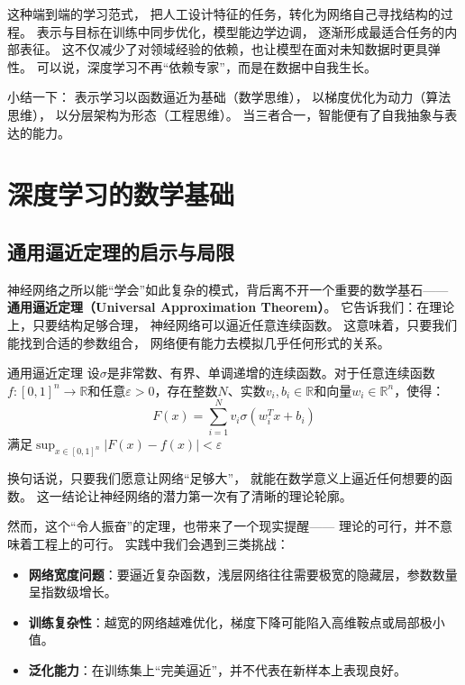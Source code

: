 这种端到端的学习范式，  
把人工设计特征的任务，转化为网络自己寻找结构的过程。  
表示与目标在训练中同步优化，模型能边学边调，  
逐渐形成最适合任务的内部表征。  
这不仅减少了对领域经验的依赖，也让模型在面对未知数据时更具弹性。  
可以说，深度学习不再“依赖专家”，而是在数据中自我生长。  

小结一下：  
表示学习以函数逼近为基础（数学思维），  
以梯度优化为动力（算法思维），  
以分层架构为形态（工程思维）。  
当三者合一，智能便有了自我抽象与表达的能力。

\section{深度学习的数学基础}

\subsection{通用逼近定理的启示与局限}

神经网络之所以能“学会”如此复杂的模式，背后离不开一个重要的数学基石——  
\textbf{通用逼近定理（Universal Approximation Theorem）}。  
它告诉我们：在理论上，只要结构足够合理，  
神经网络可以逼近任意连续函数。  
这意味着，只要我们能找到合适的参数组合，  
网络便有能力去模拟几乎任何形式的关系。

\begin{theorem}[]{通用逼近定理}
设$\sigma$是非常数、有界、单调递增的连续函数。对于任意连续函数$f: [0,1]^n \rightarrow \mathbb{R}$和任意$\varepsilon > 0$，存在整数$N$、实数$v_i, b_i \in \mathbb{R}$和向量$w_i \in \mathbb{R}^n$，使得：
$$F(x) = \sum_{i=1}^{N} v_i \sigma(w_i^T x + b_i)$$
满足$\sup_{x \in [0,1]^n} |F(x) - f(x)| < \varepsilon$
\end{theorem}

换句话说，只要我们愿意让网络“足够大”，  
就能在数学意义上逼近任何想要的函数。  
这一结论让神经网络的潜力第一次有了清晰的理论轮廓。

然而，这个“令人振奋”的定理，也带来了一个现实提醒——  
理论的可行，并不意味着工程上的可行。  
实践中我们会遇到三类挑战：

\begin{itemize}
\item \textbf{网络宽度问题}：要逼近复杂函数，浅层网络往往需要极宽的隐藏层，参数数量呈指数级增长。
\item \textbf{训练复杂性}：越宽的网络越难优化，梯度下降可能陷入高维鞍点或局部极小值。
\item \textbf{泛化能力}：在训练集上“完美逼近”，并不代表在新样本上表现良好。
\end{itemize}


